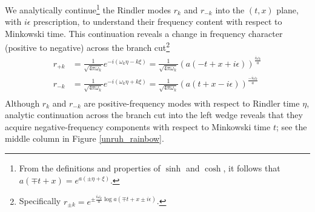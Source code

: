 \documentclass[12pt,a4paper]{article}
\begin{document}
We analytically continue\footnote{From the definitions and properties of $\sinh$ and $\cosh$, it follows that $a(\mp t + x) = e^{a(\pm \eta + \xi)}$.} the Rindler modes $r_k$ and $r_{-k}$ into the $(t,x)$ plane, with $i \epsilon$ prescription, to understand their frequency content with respect to Minkowski time. This continuation reveals a change in frequency character (positive to negative) across the branch cut\footnote{Specifically $r_{\pm k} = e^{\pm \frac{i \omega_k}{a}\log a(\mp t + x \pm i\epsilon)}$.}
\begin{equation}
  \begin{aligned}
    r_{+k} &= \frac{1}{\sqrt{4 \pi \omega_k}} e^{-i(\omega_k \eta - k \xi)} = \frac{1}{\sqrt{4 \pi \omega_k}} (a(-t + x + i \epsilon))^{\frac{i \omega_k}{a}} \\
    r_{-k} &= \frac{1}{\sqrt{4 \pi \omega_k}} e^{-i(\omega_k \eta + k \xi)} = \frac{1}{\sqrt{4 \pi \omega_k}} (a( t + x - i \epsilon))^{\frac{-i \omega_k}{a}} \\
  \end{aligned}
\end{equation}
Although $r_k$ and $r_{-k}$ are positive-frequency modes with respect to Rindler time $\eta$, analytic continuation across the branch cut into the left wedge reveals that they acquire negative-frequency components with respect to Minkowski time $t$; see the middle column in Figure \ref{unruh_rainbow}.
\end{document}
